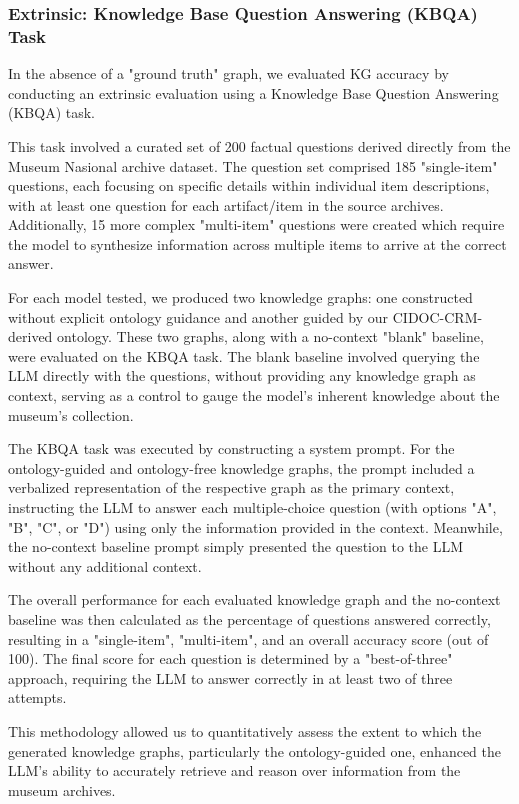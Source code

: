\documentclass[a4, conference]{IEEEtran}
\begin{document}
\subsubsection{Extrinsic: Knowledge Base Question Answering (KBQA) Task}

In the absence of a "ground truth" graph, we evaluated KG accuracy by conducting an extrinsic evaluation using a Knowledge Base Question Answering (KBQA) task.

This task involved a curated set of 200 factual questions derived directly from the Museum Nasional archive dataset. The question set comprised 185 "single-item" questions, each focusing on specific details within individual item descriptions, with at least one question for each artifact/item in the source archives. Additionally, 15 more complex "multi-item" questions were created which require the model to synthesize information across multiple items to arrive at the correct answer.

For each model tested, we produced two knowledge graphs: one constructed without explicit ontology guidance and another guided by our CIDOC-CRM-derived ontology. These two graphs, along with a no-context "blank" baseline, were evaluated on the KBQA task. The blank baseline involved querying the LLM directly with the questions, without providing any knowledge graph as context, serving as a control to gauge the model's inherent knowledge about the museum's collection.

The KBQA task was executed by constructing a system prompt. For the ontology-guided and ontology-free knowledge graphs, the prompt included a verbalized representation of the respective graph as the primary context, instructing the LLM to answer each multiple-choice question (with options "A", "B", "C", or "D") using only the information provided in the context. Meanwhile, the no-context baseline prompt simply presented the question to the LLM without any additional context.

The overall performance for each evaluated knowledge graph and the no-context baseline was then calculated as the percentage of questions answered correctly, resulting in a "single-item", "multi-item", and an overall accuracy score (out of 100). The final score for each question is determined by a "best-of-three" approach, requiring the LLM to answer correctly in at least two of three attempts.

This methodology allowed us to quantitatively assess the extent to which the generated knowledge graphs, particularly the ontology-guided one, enhanced the LLM's ability to accurately retrieve and reason over information from the museum archives.
\end{document}
